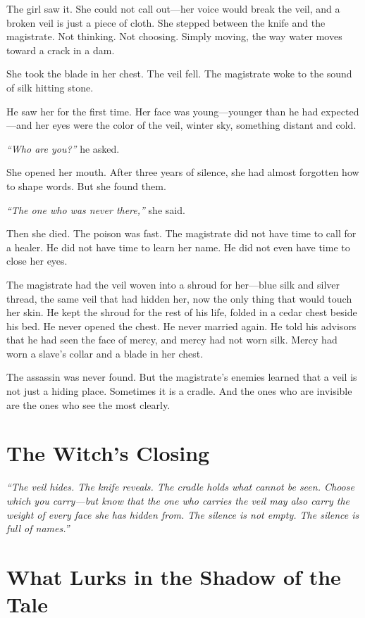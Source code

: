 The girl saw it. She could not call out---her voice would break the veil, and a broken veil is just a piece of cloth. She stepped between the knife and the magistrate. Not thinking. Not choosing. Simply moving, the way water moves toward a crack in a dam.

She took the blade in her chest. The veil fell. The magistrate woke to the sound of silk hitting stone.

He saw her for the first time. Her face was young---younger than he had expected---and her eyes were the color of the veil, winter sky, something distant and cold.

\textit{``Who are you?''} he asked.

She opened her mouth. After three years of silence, she had almost forgotten how to shape words. But she found them.

\textit{``The one who was never there,''} she said.

Then she died. The poison was fast. The magistrate did not have time to call for a healer. He did not have time to learn her name. He did not even have time to close her eyes.

The magistrate had the veil woven into a shroud for her---blue silk and silver thread, the same veil that had hidden her, now the only thing that would touch her skin. He kept the shroud for the rest of his life, folded in a cedar chest beside his bed. He never opened the chest. He never married again. He told his advisors that he had seen the face of mercy, and mercy had not worn silk. Mercy had worn a slave's collar and a blade in her chest.

The assassin was never found. But the magistrate's enemies learned that a veil is not just a hiding place. Sometimes it is a cradle. And the ones who are invisible are the ones who see the most clearly.

\section*{The Witch's Closing}
\textit{``The veil hides. The knife reveals. The cradle holds what cannot be seen. Choose which you carry---but know that the one who carries the veil may also carry the weight of every face she has hidden from. The silence is not empty. The silence is full of names.''}

\section*{What Lurks in the Shadow of the Tale}

